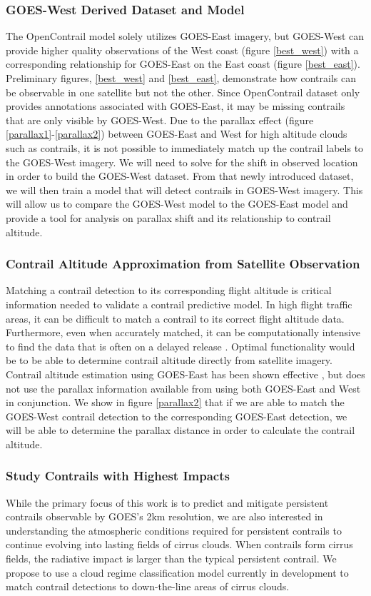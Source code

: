 \subsubsection{GOES-West Derived Dataset and Model}
The OpenContrail model solely utilizes GOES-East imagery, but GOES-West can provide higher quality observations of the West coast (figure \ref{best_west}) with a corresponding relationship for GOES-East on the East coast (figure \ref{best_east}). Preliminary figures, \ref{best_west} and \ref{best_east}, demonstrate how contrails can be observable in one satellite but not the other. Since OpenContrail dataset only provides annotations associated with GOES-East, it may be missing contrails that are only visible by GOES-West. Due to the parallax effect (figure \ref{parallax1}-\ref{parallax2}) between GOES-East and West for high altitude clouds such as contrails, it is not possible to immediately match up the contrail labels to the GOES-West imagery. We will need to solve for the shift in observed location in order to build the GOES-West dataset. From that newly introduced dataset, we will then train a model that will detect contrails in GOES-West imagery. This will allow us to compare the GOES-West model to the GOES-East model and provide a tool for analysis on parallax shift and its relationship to contrail altitude.

\subsubsection{Contrail Altitude Approximation from Satellite Observation}
Matching a contrail detection to its corresponding flight altitude is critical information needed to validate a contrail predictive model. In high flight traffic areas, it can be difficult to match a contrail to its correct flight altitude data. Furthermore, even when accurately matched, it can be computationally intensive to find the data that is often on a delayed release \cite{flight}. Optimal functionality would be to be able to determine contrail altitude directly from satellite imagery. Contrail altitude estimation using GOES-East has been shown effective \cite{alt}, but does not use the parallax information available from using both GOES-East and West in conjunction. We show in figure \ref{parallax2} that if we are able to match the GOES-West contrail detection to the corresponding GOES-East detection, we will be able to determine the parallax distance in order to calculate the contrail altitude.

\subsubsection{Study Contrails with Highest Impacts}
While the primary focus of this work is to predict and mitigate persistent contrails observable by GOES's 2km resolution, we are also interested in understanding the atmospheric conditions required for persistent contrails to continue evolving into lasting fields of cirrus clouds. When contrails form cirrus fields, the radiative impact is larger than the typical persistent contrail. We propose to use a cloud regime classification model currently in development to match contrail detections to down-the-line areas of cirrus clouds.

